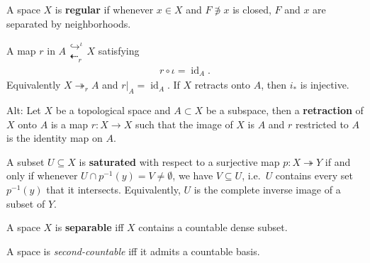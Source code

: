 \begin{definition}[Regular]

A space \(X\) is \textbf{regular} if whenever \(x\in X\) and
\(F\not\ni x\) is closed, \(F\) and \(x\) are separated by
neighborhoods.

\end{definition}

\begin{definition}[Retract]

A map \(r\) in
\(A\mathrel{\textstyle\substack{\hookrightarrow^{\iota}\\\textstyle\dashleftarrow_{r}}} X\)
satisfying
\begin{align*}r\circ\iota = \operatorname{id}_{A}.\end{align*}
Equivalently \(X \twoheadrightarrow_{r} A\) and
\({\left.{{r}} \right|_{{A}} } = \operatorname{id}_{A}\). If \(X\)
retracts onto \(A\), then \(i_*\) is injective.

Alt: Let \(X\) be a topological space and \(A \subset X\) be a subspace,
then a \textbf{retraction} of \(X\) onto \(A\) is a map \(r: X\to X\)
such that the image of \(X\) is \(A\) and \(r\) restricted to \(A\) is
the identity map on \(A\).

\end{definition}

\begin{definition}[Saturated]

A subset \(U \subseteq X\) is \textbf{saturated} with respect to a
surjective map \(p: X\twoheadrightarrow Y\) if and only if whenever
\(U \cap p ^{-1} (y) = V \neq \emptyset\), we have \(V \subseteq U\),
i.e.~\(U\) contains every set \(p ^{-1} (y)\) that it intersects.
Equivalently, \(U\) is the complete inverse image of a subset of \(Y\).

\end{definition}

\begin{definition}

A space \(X\) is \textbf{separable} iff \(X\) contains a countable dense
subset.

\end{definition}

\begin{definition}

A space is \emph{second-countable} iff it admits a countable basis.

\end{definition}

